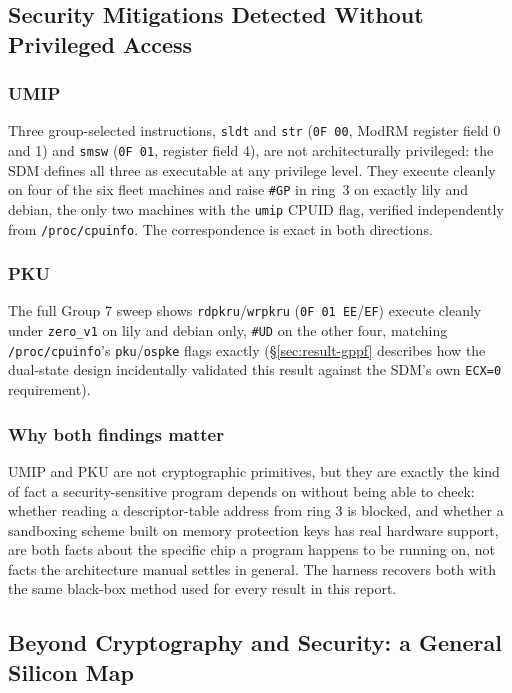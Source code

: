 \documentclass[11pt]{article}
\newcommand{\code}[1]{\texttt{#1}}
\begin{document}
\subsection{Security Mitigations Detected Without Privileged Access}
\label{sec:result-security}

\subsubsection{UMIP}

Three group-selected instructions, \code{sldt} and \code{str}
(\code{0F~00}, ModRM register field 0 and 1) and \code{smsw}
(\code{0F~01}, register field 4), are not architecturally privileged:
the SDM defines all three as executable at any privilege level. They
execute cleanly on four of the six fleet machines and raise \code{\#GP}
in ring~3 on exactly lily and debian, the only two machines with the
\code{umip} CPUID flag, verified independently from
\code{/proc/cpuinfo}. The correspondence is exact in both directions.

\subsubsection{PKU}

The full Group 7 sweep shows \code{rdpkru}/\code{wrpkru}
(\code{0F~01~EE}/\code{EF}) execute cleanly under \code{zero\_v1} on
lily and debian only, \code{\#UD} on the other four, matching
\code{/proc/cpuinfo}'s \code{pku}/\code{ospke} flags exactly
(\S\ref{sec:result-gppf} describes how the dual-state design incidentally
validated this result against the SDM's own \code{ECX=0} requirement).

\subsubsection{Why both findings matter}

UMIP and PKU are not
cryptographic primitives, but they are exactly the kind of fact a
security-sensitive program depends on without being able to check:
whether reading a descriptor-table address from ring 3 is blocked, and
whether a sandboxing scheme built on memory protection keys has real
hardware support, are both facts about the specific chip a program
happens to be running on, not facts the architecture manual settles in
general. The harness recovers both with the same black-box method used
for every result in this report.

\subsection{Beyond Cryptography and Security: a General Silicon Map}
\label{sec:result-silicon-map}
\end{document}
